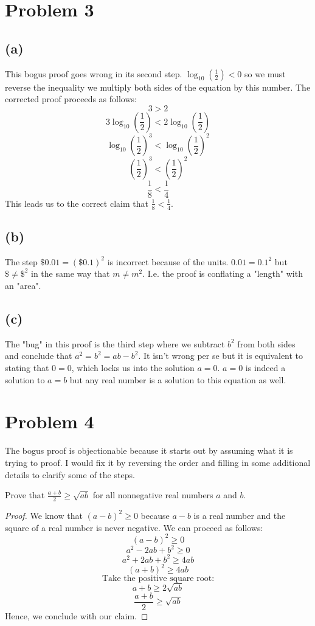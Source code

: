 \documentclass{article}
\begin{document}
\section{Problem 3}
\subsection{(a)}
This bogus proof goes wrong in its second step. $\log_{10} (\frac{1}{2}) < 0$ so we must reverse the inequality we multiply both sides of the equation by this number. The corrected proof proceeds as follows:
\[
	3 > 2
\]
\[
	3 \log_{10} \left(\frac{1}{2}\right) < 2 \log_{10} \left(\frac{1}{2}\right)
\]
\[
	\log_{10} \left(\frac{1}{2}\right)^3 < \log_{10} \left(\frac{1}{2}\right)^2
\]
\[
	\left(\frac{1}{2}\right)^3 < \left(\frac{1}{2}\right)^2
\]
\[
	\frac{1}{8} < \frac{1}{4}
\]
This leads us to the correct claim that $\frac{1}{8} < \frac{1}{4}$.
\subsection{(b)}
The step $\$0.01 = (\$0.1)^2$ is incorrect because of the units. $0.01 = 0.1^2$ but $\$ \neq \$^2$ in the same way that $m \neq m^2$. I.e. the proof is conflating a "length" with an "area".
\subsection{(c)}
The "bug" in this proof is the third step where we subtract $b^2$ from both sides and conclude that $a^2 = b^2 = ab - b^2$. It isn't wrong per se but it is equivalent to stating that $0 = 0$, which locks us into the
solution $a = 0$. $a = 0$ is indeed a solution to $a = b$ but any real number is a solution to this equation as well.
\pagebreak
\section{Problem 4}
The bogus proof is objectionable because it starts out by assuming what it is trying to proof. I would fix it by reversing the order and filling in some additional details to clarify some of the steps.

Prove that $\frac{a + b}{2} \geq \sqrt{ab}$ for all nonnegative real numbers $a$ and $b$.

\begin{proof}
	We know that $(a - b)^2 \geq 0$ because $a - b$ is a real number and the square of a real number is never negative. We can proceed as follows:
	\[
		(a - b)^2 \geq 0
	\]
	\[
		a^2 - 2ab + b^2 \geq 0
	\]
	\[
		a^2 + 2ab + b^2 \geq 4ab
	\]
	\[
		(a + b)^2 \geq 4ab
	\]
	\[
		\text{Take the positive square root:}
	\]
	\[
		a + b \geq 2\sqrt{ab}
	\]
	\[
		\frac{a + b}{2} \geq \sqrt{ab}
	\]
	Hence, we conclude with our claim.
\end{proof}
\end{document}

